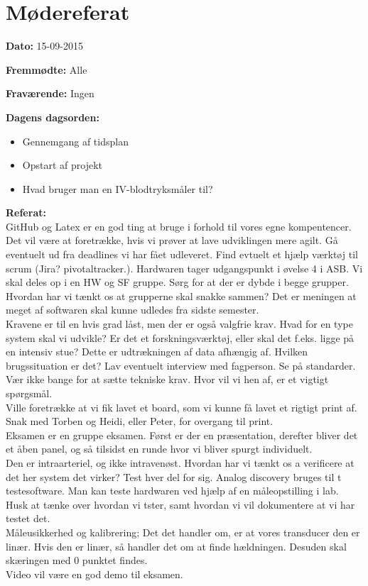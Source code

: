 \chapter{Mødereferat}

\textbf{Dato:} 15-09-2015

\textbf{Fremmødte:} Alle

\textbf{Fraværende:} Ingen

\textbf{Dagens dagsorden:}
\begin{itemize}
	\item Gennemgang af tidsplan
	\item Opstart af projekt
	\item Hvad bruger man en IV-blodtryksmåler til? 
\end{itemize}

\textbf{Referat:}
\\ GitHub og Latex er en god ting at bruge i forhold til vores egne kompentencer. 
\\ Det vil være at foretrække, hvis vi prøver at lave udviklingen mere agilt. Gå eventuelt ud fra deadlines vi har fået udleveret. Find evtuelt et hjælp værktøj til scrum (Jira? pivotaltracker.). Hardwaren tager udgangspunkt i øvelse 4 i ASB. Vi skal deles op i en HW og SF gruppe. Sørg for at der er dybde i begge grupper. Hvordan har vi tænkt os at grupperne skal snakke sammen? Det er meningen at meget af softwaren skal kunne udledes fra sidste semester. 
\\Kravene er til en hvis grad låst, men der er også valgfrie krav. Hvad for en type system skal vi udvikle? Er det et forskningsværktøj, eller skal det f.eks. ligge på en intensiv stue? Dette er udtrækningen af data afhængig af. Hvilken brugssituation er det? Lav eventuelt interview med fagperson. Se på standarder. Vær ikke bange for at sætte tekniske krav. Hvor vil vi hen af, er et vigtigt spørgsmål.
\\Ville foretrække at vi fik lavet et board, som vi kunne få lavet et rigtigt print af. Snak med Torben og Heidi, eller Peter, for overgang til print. 
\\Eksamen er en gruppe eksamen. Først er der en præsentation, derefter bliver det et åben panel, og så tilsidst en runde hvor vi bliver spurgt individuelt. 
\\Den er intraarteriel, og ikke intravenøst. Hvordan har vi tænkt os a verificere at det her system det virker? Test hver del for sig. Analog discovery bruges til t testesoftware. Man kan teste hardwaren ved hjælp af en måleopstilling i lab. Husk at tænke over hvordan vi tster, samt hvordan vi vil dokumentere at vi har testet det. 
\\Måleusikkerhed og kalibrering; Det det handler om, er at vores transducer den er linær. Hvis den er linær, så handler det om at finde hældningen. Desuden skal skæringen med 0 punktet findes. 
\\Video vil være en god demo til eksamen. 